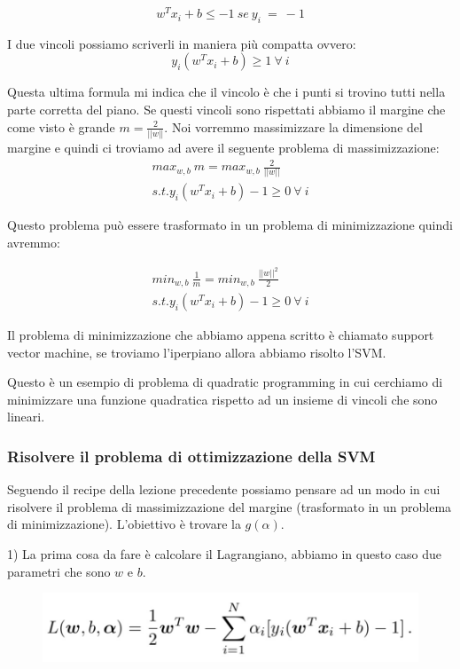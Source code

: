 \documentclass[14pt]{extreport}
\begin{document}
$$w^Tx_i+b \leq -1 \ se\ y_i\ =\ -1$$ 

I due vincoli possiamo scriverli in maniera più compatta ovvero: $$y_i(w^Tx_i+b)\geq 1 \ \forall \ i$$

Questa ultima formula mi indica che il vincolo è che i punti si trovino tutti nella parte corretta del piano. Se questi vincoli sono rispettati
abbiamo il margine che come visto è grande $m = \frac{2}{||w||}$. Noi vorremmo massimizzare la dimensione del margine e quindi ci troviamo ad avere il
seguente problema di massimizzazione:
\begin{align*} 
max_{w,b} \ m = max_{w,b} \ \frac{2}{||w||}\\ 
s.t. y_i(w^Tx_i+b) - 1 \geq 0 \ \forall \ i
\end{align*}

Questo problema può essere trasformato in un problema di minimizzazione quindi avremmo:
  
\begin{align*} 
min_{w,b} \ \frac{1}{m} = min_{w,b} \ \frac{||w||^2}{2}\\ 
s.t. y_i(w^Tx_i+b) - 1\geq 0 \ \forall \ i
\end{align*}


Il problema di minimizzazione che abbiamo appena scritto è chiamato support vector machine, se troviamo l'iperpiano allora abbiamo risolto l'SVM.

Questo è un esempio di problema di quadratic programming in cui cerchiamo di minimizzare una funzione quadratica rispetto ad un insieme di vincoli che
sono lineari.

\subsubsection{Risolvere il problema di ottimizzazione della SVM}

Seguendo il recipe della lezione precedente possiamo pensare ad un modo in cui risolvere il problema di massimizzazione del margine (trasformato in un
problema di minimizzazione). L'obiettivo è trovare la $g(\alpha)$.

1) La prima cosa da fare è calcolare il Lagrangiano, abbiamo in questo caso due parametri che sono $w$ e $b$. 
\begin{figure}[H]
\centering
\includegraphics[width=0.7\linewidth]{315.jpeg}
\end{figure}
\end{document}

